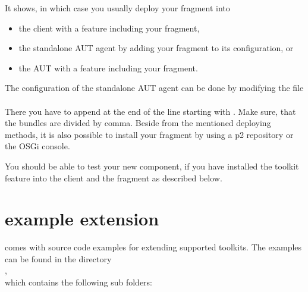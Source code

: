It shows, in which case you usually deploy your fragment into
\begin{itemize}
  \item the \app{} client with a feature including your fragment,
  \item the standalone AUT agent by adding your fragment to its configuration,
        or
  \item the AUT with a feature including your fragment.
\end{itemize}

The configuration of the standalone AUT agent can be done by modifying the
file\\
\\
There you have to append  at the end of the line
starting with . Make sure, that the bundles are divided
by comma. Beside from the mentioned deploying methods, it is also possible
to install your fragment by using a p2 repository or the OSGi console.

You should be able to test your new component, if you have installed the
toolkit feature into the \app{} client and the fragment as described below.

\section{\app{} example extension}
\label{remoteControlExamples}

\app{} comes with source code examples for extending supported toolkits. The
examples can be found in the directory\\
,\\
which contains the following sub folders:

